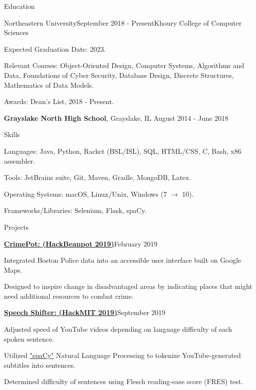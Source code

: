 \documentclass{resume}
\begin{document}
\begin{rSection}{Education}
\begin{rSubsection}{Northeastern University}{September 2018 - Present}{Khoury College of Computer Sciences}{}
\item Expected Graduation Date: 2023.
\item Relevant Courses: Object-Oriented Design, Computer Systems, Algorithms and Data, Foundations of Cyber Security, Database Design, Discrete Structures, Mathematics of Data Models.
\item Awards: Dean's List, 2018 - Present.
\end{rSubsection}

{\bf Grayslake North High School}, Grayslake, IL \hfill {August 2014 - June 2018}

\end{rSection}

\begin{rSection}{Skills}
  \begin{list}{\tiny\raisebox{1ex}{\textbullet}}{\leftmargin=2.0em}
    \item Languages: Java, Python, Racket (BSL/ISL), SQL, HTML/CSS, C, Bash, x86 assembler. 
    \item Tools: JetBrains suite, Git, Maven, Gradle, MongoDB, Latex.
    \item Operating Systems: macOS, Linux/Unix, Windows (7 $\to$ 10).
    \item Frameworks/Libraries: Selenium, Flask, spaCy.
  \end{list}
\end{rSection}
\begin{rSection}{Projects}

\begin{rSubsection}{\href{https://www.devpost.com/software/CrimePot}{{\bf CrimePot: (HackBeanpot 2019)}}}{February 2019}{}{}
\item Integrated Boston Police data into an accessible user interface built on Google Maps.
\item Designed to inspire change in disadvantaged areas by indicating places that might need additional resources to combat crime.
\end{rSubsection}

\begin{rSubsection}{\href{https://www.devpost.com/software/SpeechShifter}{\bf Speech Shifter: (HackMIT 2019)}}{September 2019}{}{}
\item Adjusted speed of YouTube videos depending on language difficulty of each spoken sentence.
\item Utilized \href{https://www.spacy.io}{"spaCy"} Natural Language Processing to tokenize YouTube-generated subtitles into sentences.
\item Determined difficulty of sentences using Flesch reading-ease score (FRES) test.
\end{rSubsection}

\end{rSection}
\end{document}
